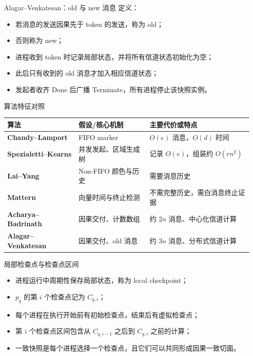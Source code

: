 \documentclass[UTF8,fontset=none,aspectratio=169,10pt]{beamer}
\begin{document}
\begin{frame}{Alagar--Venkatesan：old 与 new 消息}
定义：
\begin{itemize}
  \item 若消息的发送因果先于 token 的发送，称为 old；
  \item 否则称为 new；
  \item 进程收到 token 时记录局部状态，并将所有信道状态初始化为空；
  \item 此后只有收到的 old 消息才加入相应信道状态；
  \item 发起者收齐 Done 后广播 Terminate，所有进程停止该快照实例。
\end{itemize}
\end{frame}

\begin{frame}{算法特征对照}
\begin{tabularx}{\linewidth}{>{\bfseries}p{2.8cm}XX}
\toprule
算法 & 假设/核心机制 & 主要代价或特点 \\
\midrule
Chandy--Lamport & FIFO marker & $O(e)$ 消息，$O(d)$ 时间 \\
Spezialetti--Kearns & 并发发起、区域生成树 & 记录 $O(e)$，组装约 $O(rn^2)$ \\
Lai--Yang & Non-FIFO 颜色与历史 & 需要消息历史 \\
Mattern & 向量时间与终止检测 & 不需完整历史，需白消息终止证据 \\
Acharya--Badrinath & 因果交付、计数数组 & 约 $2n$ 消息、中心化信道计算 \\
Alagar--Venkatesan & 因果交付、old 消息 & 约 $3n$ 消息、分布式信道计算 \\
\bottomrule
\end{tabularx}
\end{frame}


\begin{frame}{局部检查点与检查点区间}
\begin{itemize}
  \item 进程运行中周期性保存局部状态，称为 local checkpoint；
  \item $p_q$ 的第 $i$ 个检查点记为 $C_{q,i}$；
  \item 每个进程在执行开始前有初始检查点，结束后有虚拟检查点；
  \item 第 $i$ 个检查点区间包含从 $C_{q,i-1}$ 之后到 $C_{q,i}$ 之前的计算；
  \item 一致快照是每个进程选择一个检查点，且它们可以共同形成因果一致切面。
\end{itemize}
\end{frame}
\end{document}
